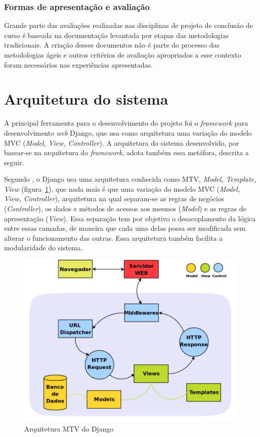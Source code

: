     \subsubsection{Formas de apresentação e avaliação}
      Grande parte das avaliações realizadas nas disciplinas de projeto de conclusão de curso é baseada na documentação levantada por etapas das metodologias tradicionais. A criação desses documentos não é parte do processo das metodologias ágeis e outros critérios de avaliação apropriados a esse contexto foram necessários nas experiências apresentadas.

\section{Arquitetura do sistema}

    A principal ferramenta para o desenvolvimento do projeto foi o \textit{framework} para desenvolvimento \textit{web} Django, que usa como arquitetura uma variação do modelo MVC (\textit{Model, View, Controller}). A arquitetura do sistema desenvolvido, por basear-se na arquitetura do \textit{framework}, adota também essa metáfora, descrita a seguir.

    Segundo , o Django usa uma arquitetura conhecida como MTV, \textit{Model, Template, View} (figura~\ref{django_arquitetura}), que nada mais é que uma variação do modelo MVC (\textit{Model, View, Controller}), arquitetura na qual separam-se as regras de negócios (\textit{Controller}), os dados e métodos de acessos aos mesmos (\textit{Model}) e as regras de apresentação (\textit{View}). Essa separação tem por objetivo o desacoplamento da lógica entre essas camadas, de maneira que cada uma delas possa ser modificada sem alterar o funcionamento das outras. Essa arquitetura também facilita a modularidade do sistema.

    \begin{figure}[h]
        \begin{center}
    \includegraphics[width=0.7\linewidth]{arquivos/django_arquitetura.png}
        \end{center}
        \caption{Arquitetura MTV do Django}
        \label{django_arquitetura}
    \end{figure}

